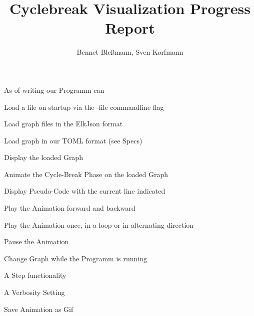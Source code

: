 \documentclass[12pt,a4paper]{article}
\author{Bennet Bleßmann, Sven Korfmann}
\title{Cyclebreak Visualization Progress Report}
\begin{document}
\maketitle

As of writing our Programm can
\begin{list}{-}{}
\item Load a file on startup via the -file commandline flag
\item Load graph files in the ElkJson format
\item Load graph in our TOML format (see Specs) 
\item Display the loaded Graph
\item Animate the Cycle-Break Phase on the loaded Graph
\item Display Pseudo-Code with the current line indicated
\item Play the Animation forward and backward
\item Play the Animation once, in a loop or in alternating direction
\item Pause the Animation
\item Change Graph while the Programm is running
\item A Step functionality
\item A Verbosity Setting
\item Save Animation as Gif

\end{list}

\end{document}
